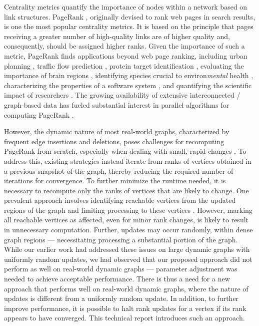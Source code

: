 Centrality metrics quantify the importance of nodes within a network based on link structures. PageRank \cite{rank-page99}, originally devised to rank web pages in search results, is one the most popular centrality metrics. It is based on the principle that pages receiving a greater number of high-quality links are of higher quality and, consequently, should be assigned higher ranks. Given the importance of such a metric, PageRank finds applications beyond web page ranking, including urban planning \cite{urban-zhang18}, traffic flow prediction \cite{traffic-kim15}, protein target identification \cite{banky2013equal}, evaluating the importance of brain regions \cite{zuo2012network}, identifying species crucial to environ\textit{mental} health \cite{allesina2009googling}, characterizing the properties of a software system \cite{chepelianskii2010towards}, and quantifying the scientific impact of researchers \cite{rank-senanayake15}. The growing availability of extensive interconnected / graph-based data has fueled substantial interest in parallel algorithms for computing PageRank \cite{rank-garg16, rank-nvgraph, rank-giri20, rank-guoqiang20, rank-li21, rank-sadi18, rank-sarma13}.

However, the dynamic nature of most real-world graphs, characterized by frequent edge insertions and deletions, poses challenges for recomputing PageRank from scratch, especially when dealing with small, rapid changes \cite{agarwal2012real, barros2021survey}. To address this, existing strategies instead iterate from ranks of vertices obtained in a previous snapshot of the graph, thereby reducing the required number of iterations for convergence. To further minimize the runtime needed, it is necessary to recompute only the ranks of vertices that are likely to change. One prevalent approach involves identifying reachable vertices from the updated regions of the graph and limiting processing to these vertices \cite{rank-desikan05, kim2015incremental, rank-giri20, sahu2022dynamic}. However, marking all reachable vertices as affected, even for minor rank changes, is likely to result in unnecessary computation. Further, updates may occur randomly, within dense graph regions --- necessitating processing a substantial portion of the graph. While our earlier work \cite{sahu2024incrementally} had addressed these issues on large dynamic graphs with uniformly random updates, we had observed that our proposed approach did not perform as well on real-world dynamic graphs --- parameter adjustment was needed to achieve acceptable performance. There is thus a need for a new approach that performs well on real-world dynamic graphs, where the nature of updates is different from a uniformly random update. In addition, to further improve performance, it is possible to halt rank updates for a vertex if its rank appears to have converged. This technical report introduces such an approach.




